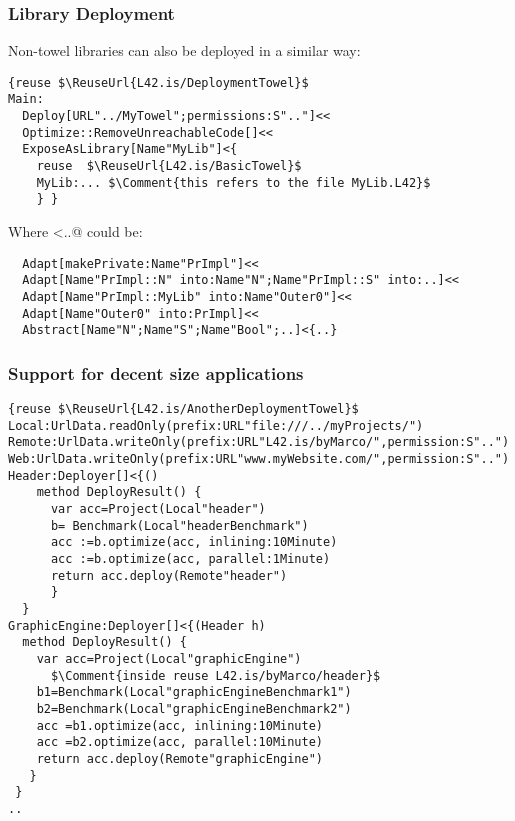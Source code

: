 \begin{frame}[fragile]
\frametitle{Library Deployment}

Non-towel libraries can also be deployed in a similar way:
\begin{NiceCode}{59ex}{0.9}
\begin{lstlisting}
{reuse $\ReuseUrl{L42.is/DeploymentTowel}$
Main:
  Deploy[URL"../MyTowel";permissions:S".."]<<
  Optimize::RemoveUnreachableCode[]<<
  ExposeAsLibrary[Name"MyLib"]<{
    reuse  $\ReuseUrl{L42.is/BasicTowel}$
    MyLib:... $\Comment{this refers to the file MyLib.L42}$
    } }
\end{lstlisting}
\end{NiceCode}


Where <{..}@
could be:
\begin{NiceCode}{59ex}{0.9}
\begin{lstlisting}
  Adapt[makePrivate:Name"PrImpl"]<<
  Adapt[Name"PrImpl::N" into:Name"N";Name"PrImpl::S" into:..]<<
  Adapt[Name"PrImpl::MyLib" into:Name"Outer0"]<<
  Adapt[Name"Outer0" into:PrImpl]<<
  Abstract[Name"N";Name"S";Name"Bool";..]<{..}
\end{lstlisting}
\end{NiceCode}

\end{frame}




\begin{frame}[fragile]
\frametitle{Support for decent size applications}

\begin{NiceCode}{59ex}{0.8}
\begin{lstlisting}
{reuse $\ReuseUrl{L42.is/AnotherDeploymentTowel}$
Local:UrlData.readOnly(prefix:URL"file:///../myProjects/")
Remote:UrlData.writeOnly(prefix:URL"L42.is/byMarco/",permission:S"..")
Web:UrlData.writeOnly(prefix:URL"www.myWebsite.com/",permission:S"..")
Header:Deployer[]<{()
    method DeployResult() {
      var acc=Project(Local"header")
      b= Benchmark(Local"headerBenchmark")
      acc :=b.optimize(acc, inlining:10Minute)
      acc :=b.optimize(acc, parallel:1Minute)
      return acc.deploy(Remote"header")
      }
  }
GraphicEngine:Deployer[]<{(Header h)
  method DeployResult() {
    var acc=Project(Local"graphicEngine")
      $\Comment{inside reuse L42.is/byMarco/header}$
    b1=Benchmark(Local"graphicEngineBenchmark1")
    b2=Benchmark(Local"graphicEngineBenchmark2")
    acc =b1.optimize(acc, inlining:10Minute)
    acc =b2.optimize(acc, parallel:10Minute)
    return acc.deploy(Remote"graphicEngine")
   }
 }
..
\end{lstlisting}
\end{NiceCode}
\end{frame}


